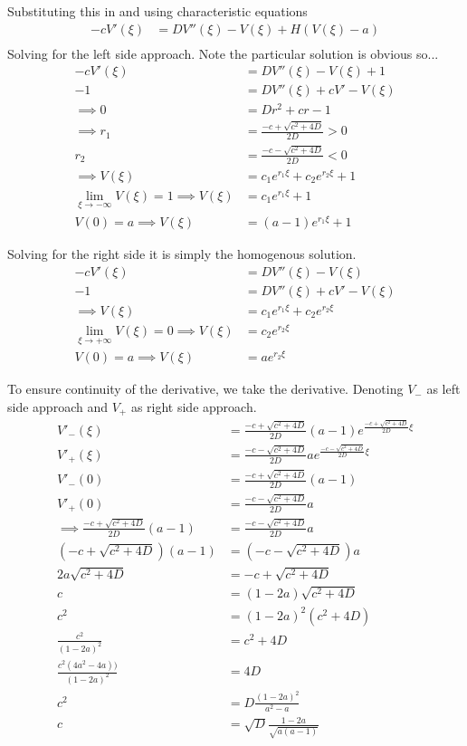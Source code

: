 \documentclass{article}
\begin{document}
Substituting this in and using characteristic equations
\begin{align}
    -cV'(\xi) &= DV''(\xi) - V(\xi) + H(V(\xi)-a)\\
\end{align}
Solving for the left side approach. Note the particular solution is obvious so...
\begin{align}
    -cV'(\xi) &= DV''(\xi) - V(\xi) + 1\\
    -1 &= DV''(\xi) + cV' - V(\xi)\\
    \implies 0 &= Dr^2 + cr - 1\\
    \implies r_1 &= \frac{-c + \sqrt{c^2+4D}}{2D} > 0\\
    r_2 &= \frac{-c - \sqrt{c^2+4D}}{2D} < 0\\
    \implies V(\xi) &= c_1 e^{r_1\xi}+c_2 e^{r_2\xi}+1\\
    \lim_{\xi\to-\infty}V(\xi) = 1 \implies V(\xi) &= c_1 e^{r_1\xi}+1\\
    V(0) = a\implies V(\xi) &= (a-1)e^{r_1\xi}+1
\end{align}

Solving for the right side it is simply the homogenous solution.
\begin{align}
    -cV'(\xi) &= DV''(\xi) - V(\xi)\\
    -1 &= DV''(\xi) + cV' - V(\xi)\\
    \implies V(\xi) &= c_1 e^{r_1\xi}+c_2 e^{r_2\xi}\\
    \lim_{\xi\to +\infty}V(\xi) = 0 \implies V(\xi) &= c_2 e^{r_2\xi}\\
    V(0) = a\implies V(\xi) &= a e^{r_2\xi}
\end{align}

To ensure continuity of the derivative, we take the derivative. Denoting
$V_-$ as left side approach and $V_+$ as right side approach.
\begin{align}
    V'_-(\xi) &= \frac{-c + \sqrt{c^2+4D}}{2D}(a-1)e^{\frac{-c + \sqrt{c^2+4D}}{2D}\xi}\\
    V'_+(\xi) &= \frac{-c - \sqrt{c^2+4D}}{2D} a e^{\frac{-c - \sqrt{c^2+4D}}{2D}\xi}\\
    V'_-(0) &= \frac{-c + \sqrt{c^2+4D}}{2D}(a-1)\\
    V'_+(0) &= \frac{-c - \sqrt{c^2+4D}}{2D} a\\
    \implies \frac{-c + \sqrt{c^2+4D}}{2D}(a-1) &= \frac{-c - \sqrt{c^2+4D}}{2D} a\\
    \left(-c + \sqrt{c^2+4D}\right)(a-1) &= \left(-c - \sqrt{c^2+4D}\right) a\\
    2a\sqrt{c^2+4D} &= -c + \sqrt{c^2+4D}\\
    c  &=  (1-2a)\sqrt{c^2+4D}\\
    c^2 &= (1-2a)^2(c^2 + 4D)\\
    \frac{c^2}{(1-2a)^2} &= c^2 + 4D\\
    \frac{c^2(4a^2 -4a))}{(1-2a)^2} &= 4D\\
    c^2 &= D\frac{(1-2a)^2}{a^2 -a}\\
    c &= \sqrt{D} \frac{1-2a}{\sqrt{a(a-1)}}
\end{align}
\end{document}
